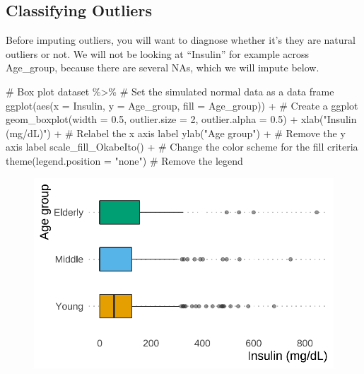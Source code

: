 \documentclass[
  letterpaper,
  DIV=11,
  numbers=noendperiod]{scrreprt}
\newenvironment{Shaded}{\begin{snugshade}}{\end{snugshade}}
\newcommand{\AttributeTok}[1]{\textcolor[rgb]{0.40,0.45,0.13}{#1}}
\newcommand{\CommentTok}[1]{\textcolor[rgb]{0.37,0.37,0.37}{#1}}
\newcommand{\DecValTok}[1]{\textcolor[rgb]{0.68,0.00,0.00}{#1}}
\newcommand{\FloatTok}[1]{\textcolor[rgb]{0.68,0.00,0.00}{#1}}
\newcommand{\FunctionTok}[1]{\textcolor[rgb]{0.28,0.35,0.67}{#1}}
\newcommand{\NormalTok}[1]{\textcolor[rgb]{0.00,0.23,0.31}{#1}}
\newcommand{\SpecialCharTok}[1]{\textcolor[rgb]{0.37,0.37,0.37}{#1}}
\newcommand{\StringTok}[1]{\textcolor[rgb]{0.13,0.47,0.30}{#1}}
\begin{document}
\hypertarget{classifying-outliers}{%
\subsection{Classifying Outliers}\label{classifying-outliers}}

Before imputing outliers, you will want to diagnose whether it's they
are natural outliers or not. We will not be looking at ``Insulin'' for
example across Age\_group, because there are several NAs, which we will
impute below.

\begin{Shaded}
\begin{Highlighting}[]
\CommentTok{\# Box plot}
\NormalTok{dataset }\SpecialCharTok{\%\textgreater{}\%} \CommentTok{\# Set the simulated normal data as a data frame}
  \FunctionTok{ggplot}\NormalTok{(}\FunctionTok{aes}\NormalTok{(}\AttributeTok{x =}\NormalTok{ Insulin, }\AttributeTok{y =}\NormalTok{ Age\_group, }\AttributeTok{fill =}\NormalTok{ Age\_group)) }\SpecialCharTok{+} \CommentTok{\# Create a ggplot}
  \FunctionTok{geom\_boxplot}\NormalTok{(}\AttributeTok{width =} \FloatTok{0.5}\NormalTok{, }\AttributeTok{outlier.size =} \DecValTok{2}\NormalTok{, }\AttributeTok{outlier.alpha =} \FloatTok{0.5}\NormalTok{) }\SpecialCharTok{+}
  \FunctionTok{xlab}\NormalTok{(}\StringTok{"Insulin (mg/dL)"}\NormalTok{) }\SpecialCharTok{+}  \CommentTok{\# Relabel the x axis label}
  \FunctionTok{ylab}\NormalTok{(}\StringTok{"Age group"}\NormalTok{) }\SpecialCharTok{+} \CommentTok{\# Remove the y axis label}
  \FunctionTok{scale\_fill\_OkabeIto}\NormalTok{() }\SpecialCharTok{+} \CommentTok{\# Change the color scheme for the fill criteria}
  \FunctionTok{theme}\NormalTok{(}\AttributeTok{legend.position =} \StringTok{"none"}\NormalTok{)  }\CommentTok{\# Remove the legend }
\end{Highlighting}
\end{Shaded}

\begin{figure}[H]

{\centering \includegraphics{./ImputatingLikeDataScientist_files/figure-pdf/unnamed-chunk-10-1.pdf}

}

\end{figure}
\end{document}
